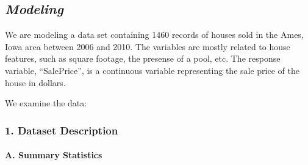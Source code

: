 \documentclass[
]{article}
\begin{document}
\hypertarget{modeling}{%
\subsection{\texorpdfstring{\emph{Modeling}}{Modeling}}\label{modeling}}

We are modeling a data set containing 1460 records of houses sold in the
Ames, Iowa area between 2006 and 2010. The variables are mostly related
to house features, such as square footage, the presense of a pool, etc.
The response variable, ``SalePrice'', is a continuous variable
representing the sale price of the house in dollars.

We examine the data:

\hypertarget{dataset-description}{%
\subsubsection{1. Dataset Description}\label{dataset-description}}

\hypertarget{a.-summary-statistics}{%
\paragraph{A. Summary Statistics}\label{a.-summary-statistics}}
\end{document}
